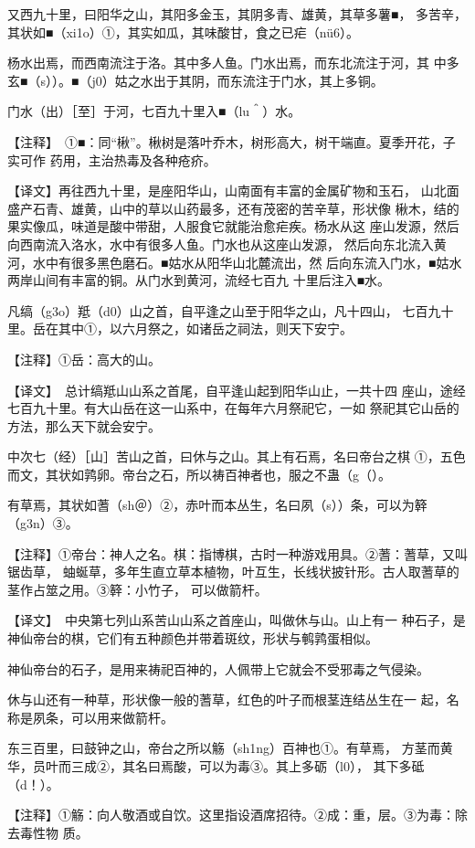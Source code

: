 \documentclass[a4paper,12pt,UTF8,twoside]{ctexbook}
\begin{document}
又西九十里，曰阳华之山，其阳多金玉，其阴多青、雄黄，其草多薯■， 多苦辛，其状如■（xi1o）①，其实如瓜，其味酸甘，食之已疟（nü6）。

杨水出焉，而西南流注于洛。其中多人鱼。门水出焉，而东北流注于河，其 中多玄■（s））。■（j0）姑之水出于其阴，而东流注于门水，其上多铜。

门水（出）［至］于河，七百九十里入■（lu＾）水。

【注释】　①■：同“楸”。楸树是落叶乔木，树形高大，树干端直。夏季开花，子实可作 药用，主治热毒及各种疮疥。

【译文】再往西九十里，是座阳华山，山南面有丰富的金属矿物和玉石， 山北面盛产石青、雄黄，山中的草以山药最多，还有茂密的苦辛草，形状像 楸木，结的果实像瓜，味道是酸中带甜，人服食它就能治愈疟疾。杨水从这 座山发源，然后向西南流入洛水，水中有很多人鱼。门水也从这座山发源， 然后向东北流入黄河，水中有很多黑色磨石。■姑水从阳华山北麓流出，然 后向东流入门水，■姑水两岸山间有丰富的铜。从门水到黄河，流经七百九 十里后注入■水。

凡缟（g3o）羝（d0）山之首，自平逢之山至于阳华之山，凡十四山， 七百九十里。岳在其中①，以六月祭之，如诸岳之祠法，则天下安宁。

【注释】①岳：高大的山。

【译文】　总计缟羝山山系之首尾，自平逢山起到阳华山止，一共十四 座山，途经七百九十里。有大山岳在这一山系中，在每年六月祭祀它，一如 祭祀其它山岳的方法，那么天下就会安宁。

中次七（经）［山］苦山之首，曰休与之山。其上有石焉，名曰帝台之棋 ①，五色而文，其状如鹑卵。帝台之石，所以祷百神者也，服之不蛊（g（）。

有草焉，其状如蓍（sh＠）②，赤叶而本丛生，名曰夙（s））条，可以为簳 （g3n）③。

【注释】①帝台：神人之名。棋：指博棋，古时一种游戏用具。②蓍：蓍草，又叫锯齿草， 蚰蜒草，多年生直立草本植物，叶互生，长线状披针形。古人取蓍草的茎作占筮之用。③簳：小竹子， 可以做箭杆。

【译文】　中央第七列山系苦山山系之首座山，叫做休与山。山上有一 种石子，是神仙帝台的棋，它们有五种颜色并带着斑纹，形状与鹌鹑蛋相似。

神仙帝台的石子，是用来祷祀百神的，人佩带上它就会不受邪毒之气侵染。

休与山还有一种草，形状像一般的蓍草，红色的叶子而根茎连结丛生在一 起，名称是夙条，可以用来做箭杆。

东三百里，曰鼓钟之山，帝台之所以觞（sh1ng）百神也①。有草焉， 方茎而黄华，员叶而三成②，其名曰焉酸，可以为毒③。其上多砺（l0）， 其下多砥（d！）。

【注释】①觞：向人敬酒或自饮。这里指设酒席招待。②成：重，层。③为毒：除去毒性物 质。
\end{document}

